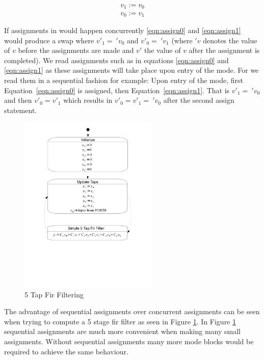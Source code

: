 \begin{align}
v_1 := v_0 \label{eqn:assign0} \\ 
v_0 := v_1 \label{eqn:assign1}
\end{align}

If assignments in  would happen concurrently \ref{eqn:assign0} and \ref{eqn:assign1} would produce a swap where $v'_1 =\: 'v_0$ and $v'_0 =\: 'v_1$ (where $'v$ denotes the value of $v$ before the assignments are made and $v'$ the value of $v$ after the assignment is completed). We read assignments such as in equations \ref{eqn:assign0} and \ref{eqn:assign1} as these assignments will take place upon entry of the mode. For  we read them in a sequential fashion for example: Upon entry of the mode, first Equation~\ref{eqn:assign0} is assigned, then Equation~\ref{eqn:assign1}. That is $v'_1 =\: 'v_0$ and then $v'_0 = v'_1$ which results in $v'_0 = v'_1 =\: 'v_0$ after the second assign statement.

\begin{figure}[htp]
    \centering
    \includegraphics[trim= 10mm 70mm 10mm 10mm, clip, width=250px]{./images/state_uml2_fir.pdf}
    \caption{5 Tap Fir Filtering}
    \label{fig:state_uml2_fir}
\end{figure}

The advantage of sequential assignments over concurrent assignments can be seen when trying to compute a 5 stage fir filter as seen in Figure \ref{fig:state_uml2_fir}. In Figure \ref{fig:state_uml2_fir} sequential assignments are much more convenient when making many small assignments. Without sequential assignments many more mode blocks would be required to achieve the same behaviour.




